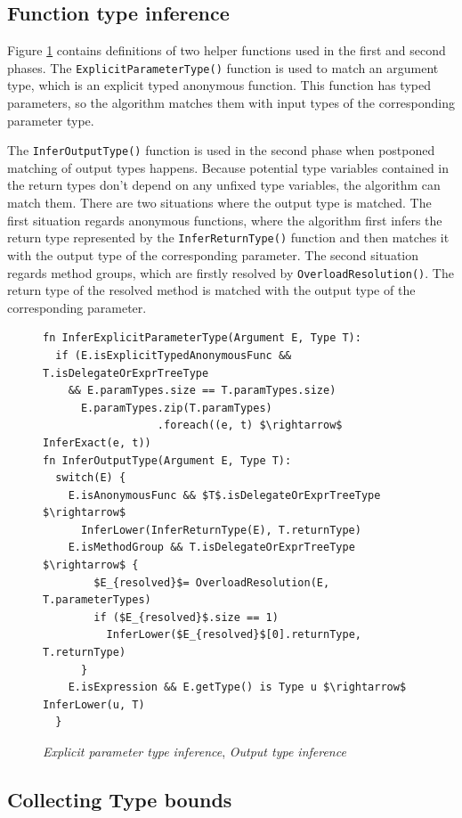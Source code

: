 \subsection{Function type inference}

Figure \ref{img11:methodTypeInference2} contains definitions of two helper functions used in the first and second phases. 
The \texttt{ExplicitParameterType()} function is used to match an argument type, which is an explicit typed anonymous function. 
This function has typed parameters, so the algorithm matches them with input types of the corresponding parameter type.
\par
The \texttt{InferOutputType()} function is used in the second phase when postponed
matching of output types happens. 
Because potential type variables contained in the return types don’t depend on any unfixed type variables, the algorithm can match them. 
There are two situations where the output type is matched. 
The first situation regards anonymous functions, where the algorithm first infers the return type represented by the \texttt{InferReturnType()} function and then matches it with the output type of the corresponding parameter. 
The second situation regards method groups, which are firstly resolved by \texttt{OverloadResolution()}. 
The return type of the resolved method is matched with the output type of the corresponding parameter.
\begin{figure}[h!]
\begin{lstlisting}[style=myAlgo, mathescape=true]
fn InferExplicitParameterType(Argument E, Type T):
  if (E.isExplicitTypedAnonymousFunc && T.isDelegateOrExprTreeType
    && E.paramTypes.size == T.paramTypes.size)
      E.paramTypes.zip(T.paramTypes)
                  .foreach((e, t) $\rightarrow$ InferExact(e, t))
fn InferOutputType(Argument E, Type T):
  switch(E) {
	E.isAnonymousFunc && $T$.isDelegateOrExprTreeType $\rightarrow$
	  InferLower(InferReturnType(E), T.returnType) 
	E.isMethodGroup && T.isDelegateOrExprTreeType $\rightarrow$ {
	  	$E_{resolved}$= OverloadResolution(E, T.parameterTypes)
	  	if ($E_{resolved}$.size == 1) 
	  	  InferLower($E_{resolved}$[0].returnType, T.returnType) 
	  }
	E.isExpression && E.getType() is Type u $\rightarrow$ InferLower(u, T)
  }
\end{lstlisting}
\caption{\textit{Explicit parameter type inference}, \textit{Output type inference}}
\label{img11:methodTypeInference2}
\end{figure}
\newpage
\subsection{Collecting Type bounds}

